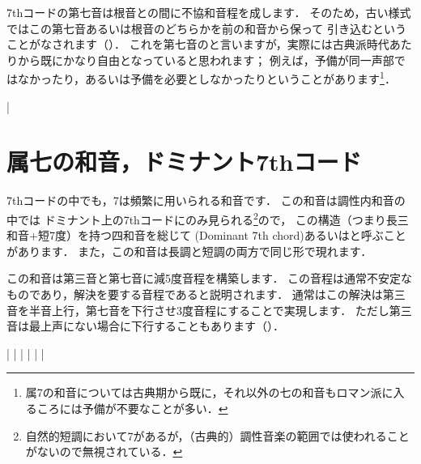 \documentclass[dvipdfmx,uplatex,b5paper,openany,jbase=12Q,nomag*,textwidth-limit=44%
               ]{gachimuchi}[2020/05/05]
\begin{document}
7thコードの第七音は根音との間に不協和音程を成します．
そのため，古い様式ではこの第七音あるいは根音のどちらかを前の和音から保って
引き込むということがなされます（）．
これを第七音のと言いますが，実際には古典派時代あたりから既にかなり自由となっていると思われます；
例えば，予備が同一声部ではなかったり，あるいは予備を必要としなかったりということがあります\footnote{%
  属7の和音については古典期から既に，それ以外の七の和音もロマン派に入るころには予備が不要なことが多い．%
}．

\begin{floatMusic}[pos=ht,width=0.5\linewidth]
  \nostartrule%
  \Startpiece%
  \Notes%
  \en%
  \Notes%
  \en\bar%
  \Notes%
  \en%
  \Notes%
  \en
  \endpiece%
\end{floatMusic}


\section{属七の和音，ドミナント7thコード}
7thコードの中でも，\Gnv\subsc7は頻繁に用いられる和音です．
この和音は調性内和音の中では%
ドミナント上の7thコードにのみ見られる\footnote{%
  自然的短調において\bFlat\Gnvii\subsc7があるが，（古典的）調性音楽の範囲では使われることがないので無視されている．
}ので，
この構造（つまり長三和音$+$短7度）を持つ四和音を総じて
\xkanjispace(Dominant 7th chord)あるいはと呼ぶことがあります．
また，この和音は長調と短調の両方で同じ形で現れます．

この和音は第三音と第七音に減5度音程を構築します．
この音程は通常不安定なものであり，解決を要する音程であると説明されます．
通常はこの解決は第三音を半音上行，第七音を下行させ3度音程にすることで実現します．
ただし第三音は最上声にない場合に下行することもあります（）．

\begin{floatMusic}[pos=ht,width=0.5\linewidth]
  \Startpiece%
  \Notes%
  |%
  \en\bar%
  \Notes%
  |%
  \en\doublebar%
  \Notes%
  |%
  \en\bar%
  \Notes%
  |%
  \en\setdoublebar
  \endpiece%
\end{floatMusic}
\end{document}
